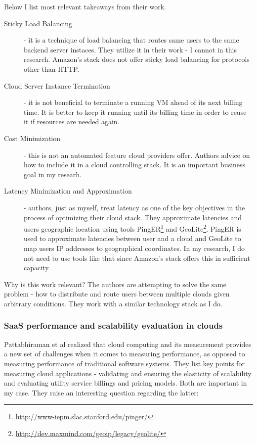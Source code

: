 \documentclass{uvamscse}
\begin{document}
Below I list most relevant takeaways from their work.

\begin{description}
  \item[Sticky Load Balancing] - it is a technique of load balancing that routes same users to the same backend server instaces. They utilize it in their work - I cannot in this research. Amazon's stack does not offer sticky load balancing for protocols other than HTTP.
  \item[Cloud Server Instance Termination] - it is not beneficial to terminate a running VM ahead of its next billing time. It is better to keep it running until its billing time in order to reuse it if resources are needed again.
  \item[Cost Minimization] - this is not an automated feature cloud providers offer. Authors advice on how to include it in a cloud controlling stack. It is an important business goal in my researh.
  \item[Latency Minimization and Approximation] - authors, just as myself, treat latency as one of the key objectives in the process of optimizing their cloud stack. They approximate latencies and users geographic location using tools PingER\footnote{\url{http://www-iepm.slac.stanford.edu/pinger/}} and GeoLite\footnote{\url{http://dev.maxmind.com/geoip/legacy/geolite/}}. PingER is used to approximate latencies between user and a cloud and GeoLite to map users IP addresses to geographical coordinates. In my research, I do not need to use tools like that since Amazon's stack offers this in sufficient capacity.
\end{description}

Why is this work relevant? The authors are attempting to solve the same problem - how to distribute and route users between multiple clouds given arbitrary conditions. They work with a similar technology stack as I do.

\subsubsection{SaaS performance and scalability evaluation in clouds}

Pattabhiraman et al realized that cloud computing and its measurement provides a new set of challenges when it comes to measuring performance, as opposed to measuring performance of traditional software systems. They list key points for measuring cloud applications - validating and ensuring the elasticity of scalability and evaluating utility service billings and pricing models. Both are important in my case. They raise an interesting question regarding the latter:
\end{document}
